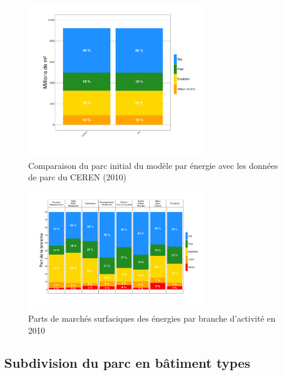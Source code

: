 \documentclass[10.5pt,a4paper]{article}
\begin{document}
{\begin{figure}[ht]
\centering
\caption{Comparaison du parc initial du modèle par énergie avec les données de parc du CEREN (2010)}\label{CompParcEnergieCEREN2010}
\includegraphics[width = 0.7\textwidth]{CompParcEnergieCEREN2010}
\end{figure}


\begin{figure}[ht]
\centering
\caption{Parts de marchés surfaciques des énergies par branche d'activité en 2010  }\label{ParcEnergieBranche2010}
\includegraphics[width = 0.7\textwidth]{ParcEnergieBranche2010}
\end{figure}

\subsection{Subdivision du parc en \og bâtiment types \fg}

}
\end{document}
